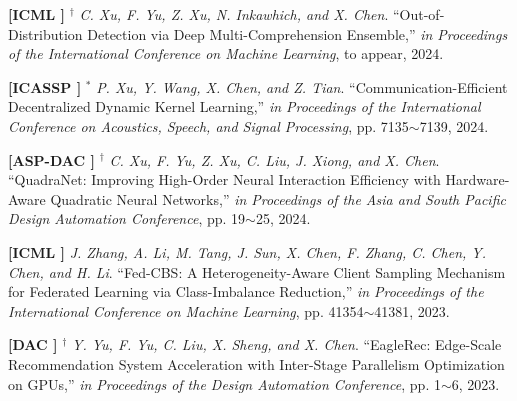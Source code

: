 







	\textbf{[ICML ]}
	$^\dagger$
	\textsl{C. Xu, F. Yu, Z. Xu, N. Inkawhich, and X. Chen}.
		``Out-of-Distribution Detection via Deep Multi-Comprehension Ensemble,''
			\textsl{in Proceedings of the International Conference on Machine Learning}, to appear, 2024.
			\vspace{-3mm}

	\textbf{[ICASSP ]}
	$^\ast$
	\textsl{P. Xu, Y. Wang, X. Chen, and Z. Tian}.
		``Communication-Efficient Decentralized Dynamic Kernel Learning,''
			\textsl{in Proceedings of the International Conference on Acoustics, Speech, and Signal Processing},  pp. 7135$\sim$7139, 2024.
			\vspace{-3mm}

	\textbf{[ASP-DAC ]}
	$^\dagger$
	\textsl{C. Xu, F. Yu, Z. Xu, C. Liu, J. Xiong, and X. Chen}.
		``QuadraNet: Improving High-Order Neural Interaction Efficiency with Hardware-Aware Quadratic Neural Networks,''
			\textsl{in Proceedings of the Asia and South Pacific Design Automation Conference}, pp. 19$\sim$25, 2024.
			\vspace{-3mm}

	\textbf{[ICML ]}
	\textsl{J. Zhang, A. Li, M. Tang, J. Sun, X. Chen, F. Zhang, C. Chen, Y. Chen, and H. Li}.
		``Fed-CBS: A Heterogeneity-Aware Client Sampling Mechanism for Federated Learning via Class-Imbalance Reduction,''
			\textsl{in Proceedings of the International Conference on Machine Learning}, pp. 41354$\sim$41381, 2023.
			\vspace{-3mm}

	\textbf{[DAC ]}
	$^\dagger$
	\textsl{Y. Yu, F. Yu, C. Liu, X. Sheng, and X. Chen}.
		``EagleRec: Edge-Scale Recommendation System Acceleration with Inter-Stage Parallelism Optimization on GPUs,''
		\textsl{in Proceedings of the Design Automation Conference}, pp. 1$\sim$6, 2023.
			\vspace{-3mm}

